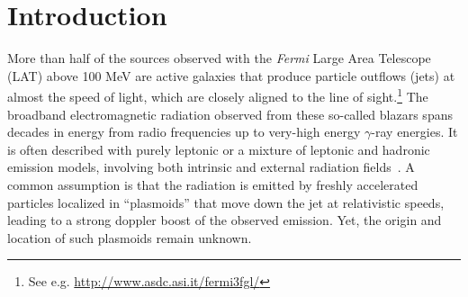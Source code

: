 \documentclass[twocolumn]{aastex62}
\newcommand{\gray}{$\gamma$-ray\xspace}
\newcommand{\Fermi}{\emph{Fermi}\xspace}
\begin{document}
\section{Introduction} \label{sec:intro}

More than half of the sources observed with the \Fermi Large Area Telescope (LAT) above 100 MeV are active galaxies that produce particle outflows (jets) at almost the speed of light, which are closely aligned to the line of sight.\footnote{See e.g. \url{http://www.asdc.asi.it/fermi3fgl/}}
The broadband electromagnetic radiation observed from these so-called blazars spans decades in energy from radio frequencies up to very-high energy \gray energies. 
It is often described with purely leptonic or a mixture of leptonic and hadronic emission models, involving both intrinsic and external radiation fields~\cite[e.g.][and references therein]{Madejski:2016oqg}.
A common assumption is that the radiation is emitted by freshly accelerated   particles localized in ``plasmoids''  that move down the jet at relativistic speeds,
 leading to a strong doppler boost of the observed emission. 
Yet, the origin and location of such plasmoids remain unknown. 
\end{document}

